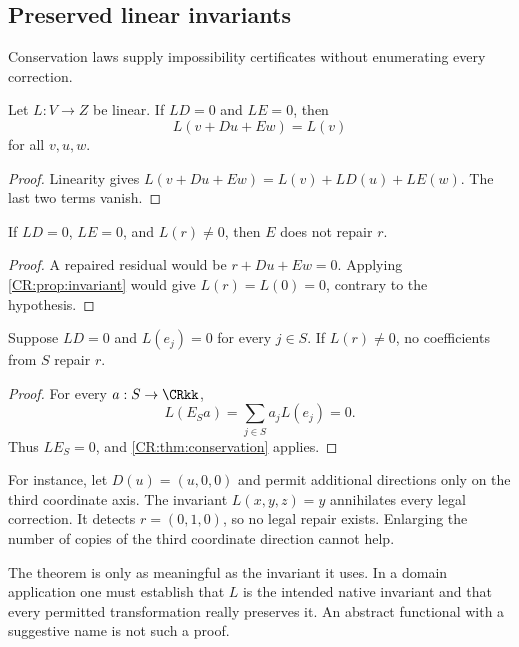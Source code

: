 \subsection{Preserved linear invariants}
Conservation laws supply impossibility certificates without enumerating every correction.

\begin{CRproposition}\label{CR:prop:invariant}
Let $L:V\to Z$ be linear. If $LD=0$ and $LE=0$, then
\[
L(v+Du+Ew)=L(v)
\]
for all $v,u,w$.
\end{CRproposition}
\begin{proof}
Linearity gives $L(v+Du+Ew)=L(v)+LD(u)+LE(w)$. The last two terms vanish.
\end{proof}

\begin{CRtheorem}\label{CR:thm:conservation}
If $LD=0$, $LE=0$, and $L(r)\ne0$, then $E$ does not repair $r$.
\end{CRtheorem}
\begin{proof}
A repaired residual would be $r+Du+Ew=0$. Applying \cref{CR:prop:invariant} would give $L(r)=L(0)=0$, contrary to the hypothesis.
\end{proof}

\begin{CRcorollary}\label{CR:cor:menu-conservation}
Suppose $LD=0$ and $L(e_j)=0$ for every $j\in S$. If $L(r)\ne0$, no coefficients from $S$ repair $r$.
\end{CRcorollary}
\begin{proof}
For every $a:S\to\CRkk$,
\[
L(E_Sa)=\sum_{j\in S}a_jL(e_j)=0.
\]
Thus $LE_S=0$, and \cref{CR:thm:conservation} applies.
\end{proof}

For instance, let $D(u)=(u,0,0)$ and permit additional directions only on the third coordinate axis. The invariant $L(x,y,z)=y$ annihilates every legal correction. It detects $r=(0,1,0)$, so no legal repair exists. Enlarging the number of copies of the third coordinate direction cannot help.

The theorem is only as meaningful as the invariant it uses. In a domain application one must establish that $L$ is the intended native invariant and that every permitted transformation really preserves it. An abstract functional with a suggestive name is not such a proof.


